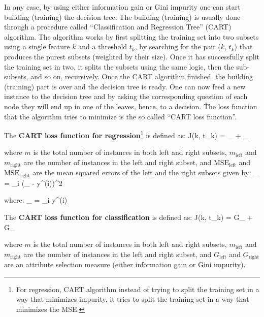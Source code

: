 In any case, by using either information gain or Gini impurity one can start building (training) the decision tree.
The building (training) is usually done through a procedure called ``Classification and Regression Tree'' (CART)
algorithm. The algorithm works by first splitting the training set into two subsets using a single feature $k$ and a
threshold $t_k$, by searching for the pair ($k$, $t_k$) that produces the purest subsets (weighted by their size).
Once it has successfully split the training set in two, it splits the subsets using the same logic, then the
sub-subsets, and so on, recursively. Once the CART algorithm finished, the building (training) part is over and the
decision tree is ready. One can now feed a new instance to the decision tree and by asking the corresponding
question of each node they will end up in one of the leaves, hence, to a decision. \v

The loss function that the algorithm tries to minimize is the so called ``CART loss function''.

The \textbf{CART loss function for regression}\footnote{For regression, CART algorithm instead of trying to split the
training set in a way that minimizes impurity, it tries to split the training set in a way that minimizes the MSE\@.}
is defined as:
\bse
J(k, t_{k}) =  _{} + _{}
\ese

where $m$ is the total number of instances in both left and right subsets, $m_{\text{left}}$ and $m_{\text{right}}$ are
the number of instances in the left and right subset, and $\text{MSE}_{\text{left}}$ and $\text{MSE}_{\text{right}}$ are
the mean squared errors of the left and the right subsets given by:
\bse
{}_{} = \sum_{i \in {}} ({}_ - y^{(i)})^2
\ese

where:
\bse
{}_ =  \sum_{i \in {}} y^{(i)}
\ese

The \textbf{CART loss function for classification} is defined as:
\bse
J(k, t_{k}) =  G_{} +  G_{}
\ese

where $m$ is the total number of instances in both left and right subsets, $m_{\text{left}}$ and $m_{\text{right}}$ are
the number of instances in the left and right subset, and $G_{\text{left}}$ and $G_{\text{right}}$ are an attribute
selection measure (either information gain or Gini impurity).
\ed

